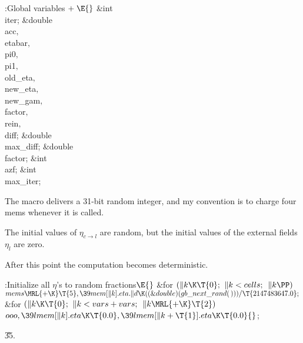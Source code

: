 \B{}:Global variables\X${}\mathrel+\E{}$\6
\&{int} \\{iter};\6
\&{double} \\{acc}${},{}$ \\{etabar}${},{}$ \\{pi0}${},{}$ \\{pi1}${},{}$ %
\\{old\_eta}${},{}$ \\{new\_eta}${},{}$ \\{new\_gam}${},{}$ \\{factor}${},{}$ %
\\{rein}${},{}$ \\{diff};\6
\&{double} \\{max\_diff};\6
\&{double} \\{factor};\6
\&{int} \\{azf};\6
\&{int} \\{max\_iter};\par
\fi

The macro  delivers a 31-bit
random integer,
and my convention is to charge four mems whenever it is called.

The initial values of $\eta_{c\to l}$ are random, but the
initial values of the external fields $\eta_l$ are zero.

After this point the computation becomes deterministic.

\Y\B\4:Initialize all $\eta$'s to random fractions\X${}\E{}$\6
\&{for} ${}(\|k\K\T{0};{}$ ${}\|k<\\{cells};{}$ ${}\|k\PP){}$\1\5
${}\\{mems}\MRL{+{\K}}\T{5},\39\\{mem}[\|k].\\{eta}.\|d\K((\&{double})(\\{gb%
\_next\_rand}(\,)))/\T{2147483647.0};{}$\2\6
\&{for} ${}(\|k\K\T{0};{}$ ${}\|k<\\{vars}+\\{vars};{}$ ${}\|k\MRL{+{\K}}%
\T{2}){}$\1\5
${}\\{ooo},\39\\{lmem}[\|k].\\{eta}\K\T{0.0},\39\\{lmem}[\|k+\T{1}].\\{eta}\K%
\T{0.0}{}$;\2\par
\U35.\fi

